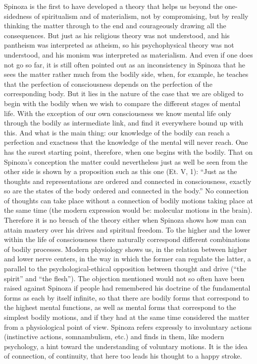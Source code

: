 \documentclass[12pt]{book}
\newcommand{\opage}[1]{\marginnote{\footnotesize\textit{[#1]}}}
\begin{document}
Spinoza is the first to have developed a theory that helps us beyond the one-sidedness
of spiritualism and of materialism, not by compromising, but by really thinking the
matter through to the end and courageously drawing all the consequences. But just as
his religious theory was not understood, and his pantheism was interpreted as atheism,
so his psychophysical theory was not understood, and his monism was interpreted as
materialism. And even if one does not go so far, it is still often pointed out as an
inconsistency in Spinoza that he sees the matter rather much from the bodily side, when,
for example, he teaches that the perfection of consciousness depends on the perfection
of the corresponding body. But it lies in the nature of the case that we are obliged to
begin with the bodily when we wish to compare the different \opage{99}stages of mental
life. With the exception of our own consciousness we know mental life only through the
bodily as intermediate link, and find it everywhere bound up with this. And what is the
main thing: our knowledge of the bodily can reach a perfection and exactness that the
knowledge of the mental will never reach. One has the surest starting point, therefore,
when one begins with the bodily. That on Spinoza's conception the matter could
nevertheless just as well be seen from the other side is shown by a proposition such as
this one (Et. V, 1): ``Just as the thoughts and representations are ordered and
connected in consciousness, exactly so are the states of the body ordered and connected
in the body.'' No connection of thoughts can take place without a connection of bodily
motions taking place at the same time (the modern expression would be: molecular motions
in the brain). Therefore it is no breach of the theory either when Spinoza shows how man
can attain mastery over his drives and spiritual freedom. To the higher and the lower
within the life of consciousness there naturally correspond different combinations of
bodily processes. Modern physiology shows us, in the relation between higher and lower
nerve centers, in the way in which the former can regulate the latter, a parallel to the
psychological-ethical opposition between thought and drive (``the spirit'' and ``the
flesh''). The objection mentioned would not so often have been raised against Spinoza if
people had remembered his doctrine of the fundamental forms as each by itself infinite,
so that there are bodily forms that correspond to the highest mental functions, as well
as \opage{100}mental forms that correspond to the simplest bodily motions, and if they
had at the same time considered the matter from a physiological point of view. Spinoza
refers expressly to involuntary actions (instinctive actions, somnambulism, etc.) and
finds in them, like modern psychology, a hint toward the understanding of voluntary
motions. It is the idea of connection, of continuity, that here too leads his thought
to a happy stroke.
\end{document}
